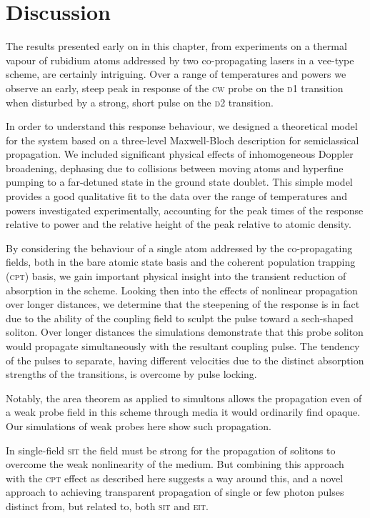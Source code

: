 \section{Discussion}
  \label{sec:simultons_discussion}

  The results presented early on in this chapter, from experiments on a thermal
  vapour of rubidium atoms addressed by two co-propagating lasers in a vee-type
  scheme, are certainly intriguing. Over a range of temperatures and powers we
  observe an early, steep peak in response of the \textsc{cw} probe on the
  \textsc{d1} transition when disturbed by a strong, short pulse on the
  \textsc{d2} transition.

  In order to understand this response behaviour, we designed a theoretical
  model for the system based on a three-level Maxwell-Bloch description for
  semiclassical propagation. We included significant physical effects of
  inhomogeneous Doppler broadening, dephasing due to collisions between moving
  atoms and hyperfine pumping to a far-detuned state in the ground state
  doublet. This simple model provides a good qualitative fit to the data over
  the range of temperatures and powers investigated experimentally, accounting
  for the peak times of the response relative to power and the relative height
  of the peak relative to atomic density.

  By considering the behaviour of a single atom addressed by the co-propagating
  fields, both in the bare atomic state basis and the coherent population
  trapping (\textsc{cpt}) basis, we gain important physical insight into the
  transient reduction of absorption in the scheme. Looking then into the effects
  of nonlinear propagation over longer distances, we determine that the
  steepening of the response is in fact due to the ability of the coupling field
  to sculpt the pulse toward a sech-shaped soliton. Over longer distances the
  simulations demonstrate that this probe soliton would propagate simultaneously
  with the resultant coupling pulse. The tendency of the pulses to separate,
  having different velocities due to the distinct absorption strengths of the
  transitions, is overcome by pulse locking.

  Notably, the area theorem as applied to simultons allows the propagation even
  of a weak probe field in this scheme through media it would ordinarily find
  opaque. Our simulations of weak probes here show such propagation.

  In single-field \textsc{sit} the field must be strong for the propagation of
  solitons to overcome the weak nonlinearity of the medium. But combining this
  approach with the \textsc{cpt} effect as described here suggests a way around
  this, and a novel approach to achieving transparent propagation of single or
  few photon pulses distinct from, but related to, both \textsc{sit} and
  \textsc{eit}.

